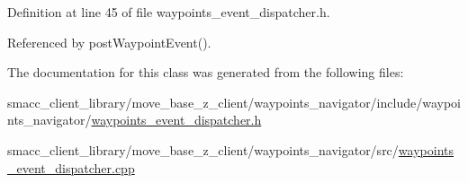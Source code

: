 Definition at line 45 of file waypoints\+\_\+event\+\_\+dispatcher.\+h.



Referenced by post\+Waypoint\+Event().



The documentation for this class was generated from the following files\+:\begin{DoxyCompactItemize}
\item 
smacc\+\_\+client\+\_\+library/move\+\_\+base\+\_\+z\+\_\+client/waypoints\+\_\+navigator/include/waypoints\+\_\+navigator/\hyperlink{waypoints__event__dispatcher_8h}{waypoints\+\_\+event\+\_\+dispatcher.\+h}\item 
smacc\+\_\+client\+\_\+library/move\+\_\+base\+\_\+z\+\_\+client/waypoints\+\_\+navigator/src/\hyperlink{waypoints__event__dispatcher_8cpp}{waypoints\+\_\+event\+\_\+dispatcher.\+cpp}\end{DoxyCompactItemize}
